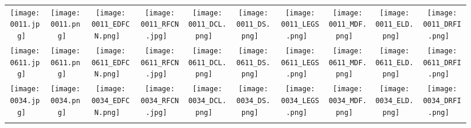 \documentclass[10pt,twocolumn,letterpaper]{article}
\begin{document}
\begin{figure*}
\centering
\begin{tabular}{@{}c@{}c@{}c@{}c@{}c@{}c@{}c@{}c@{}c@{}c}
\vspace{-1mm}
\texttt{[image: 0011.jpg]} \ &
\texttt{[image: 0011.png]} \ &
\texttt{[image: 0011\_EDFCN.png]} \ &
\texttt{[image: 0011\_RFCN.jpg]} \ &
\texttt{[image: 0011\_DCL.png]} \ &
\texttt{[image: 0011\_DS.png]} \ &
\texttt{[image: 0011\_LEGS.png]} \ &
\texttt{[image: 0011\_MDF.png]} \ &
\texttt{[image: 0011\_ELD.png]} \ &
\texttt{[image: 0011\_DRFI.png]} \ \\
\vspace{-1mm}
\texttt{[image: 0611.jpg]} \ &
\texttt{[image: 0611.png]} \ &
\texttt{[image: 0611\_EDFCN.png]} \ &
\texttt{[image: 0611\_RFCN.jpg]} \ &
\texttt{[image: 0611\_DCL.png]} \ &
\texttt{[image: 0611\_DS.png]} \ &
\texttt{[image: 0611\_LEGS.png]} \ &
\texttt{[image: 0611\_MDF.png]} \ &
\texttt{[image: 0611\_ELD.png]} \ &
\texttt{[image: 0611\_DRFI.png]} \ \\
\vspace{-1mm}
\texttt{[image: 0034.jpg]} \ &
\texttt{[image: 0034.png]} \ &
\texttt{[image: 0034\_EDFCN.png]} \ &
\texttt{[image: 0034\_RFCN.jpg]} \ &
\texttt{[image: 0034\_DCL.png]} \ &
\texttt{[image: 0034\_DS.png]} \ &
\texttt{[image: 0034\_LEGS.png]} \ &
\texttt{[image: 0034\_MDF.png]} \ &
\texttt{[image: 0034\_ELD.png]} \ &
\texttt{[image: 0034\_DRFI.png]} \ \\
\vspace{-1mm}

\end{tabular}
\end{figure*}
\end{document}
